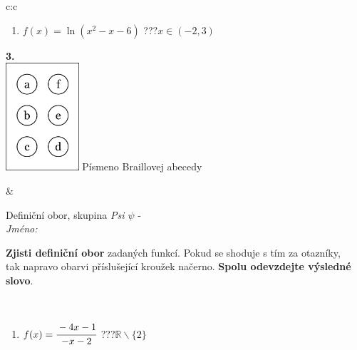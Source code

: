 \documentclass[10pt]{report}
\begin{document}
\begin{tabular}{c:c}
\begin{minipage}[c][104.5mm][t]{0.5\linewidth}
\begin{center}
\begin{minipage}{0.79\linewidth}
\begin{center}
\begin{varwidth}{\linewidth}
\begin{enumerate}
\item $f(x)=\ln{(x^2-x-6)}$\quad \dotfill\; ???\;\dotfill \quad $x\in(-2 , 3)$
\end{enumerate}
\end{varwidth}
\end{center}
\end{minipage}
\begin{minipage}{0.20\linewidth}
\begin{center}
{\Huge\bfseries 3.} \\[2mm]
\includegraphics[height=40mm]{../images/braille.png}
{\small Písmeno Braillovej abecedy}
\end{center}
\end{minipage}
\end{center}
\end{minipage}
&
\begin{minipage}[c][104.5mm][t]{0.5\linewidth}
\begin{center}
\vspace{7mm}
{\huge Definiční obor, skupina \textit{Psi $\psi$} -}\\[5mm]
\textit{Jméno:}\phantom{xxxxxxxxxxxxxxxxxxxxxxxxxxxxxxxxxxxxxxxxxxxxxxxxxxxxxxxxxxxxxxxxx}\\[5mm]
\begin{minipage}{0.95\linewidth}
\begin{center}
\textbf{Zjisti definiční obor} zadaných funkcí. Pokud se shoduje s tím za otazníky,\\tak napravo obarvi příslušející kroužek načerno. \textbf{Spolu odevzdejte výsledné slovo}.
\end{center}
\end{minipage}
\\[1mm]
\begin{minipage}{0.79\linewidth}
\begin{center}
\begin{varwidth}{\linewidth}
\begin{enumerate}
\normalsizerrr
\item $f(x)=\cfrac{-4x-1}{-x-2}$\quad \dotfill\; ???\;\dotfill \quad $\mathbb{R}\smallsetminus\{2\}$

\end{enumerate}
\end{varwidth}
\end{center}
\end{minipage}
\end{center}
\end{minipage}
\end{tabular}
\end{document}
